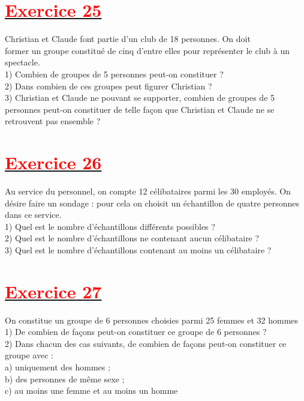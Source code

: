 \documentclass[12pt,a4paper]{article}
\begin{document}
\section*{\underline{\textbf{\textcolor{red}{Exercice 25}}}}
Christian et Claude font partie d’un club de 18 personnes. On doit\\ former un groupe constitué de cinq d’entre elles pour représenter le club à un spectacle.\\
1) Combien de groupes de 5 personnes peut-on constituer ?\\
2) Dans combien de ces groupes peut figurer Christian ?\\
3) Christian et Claude ne pouvant se supporter, combien de groupes de 5 personnes peut-on constituer de telle façon que Christian et Claude ne se retrouvent pas ensemble ?\\
\section*{\underline{\textbf{\textcolor{red}{Exercice 26}}}}
Au service du personnel, on compte 12 célibataires parmi les 30 employés. On désire faire un sondage : pour cela on choisit un échantillon de quatre personnes dans ce service.\\
1) Quel est le nombre d’échantillons différents possibles ?\\
2) Quel est le nombre d’échantillons ne contenant aucun célibataire ?\\
3) Quel est le nombre d’échantillons contenant au moins un célibataire ?\\
\section*{\underline{\textbf{\textcolor{red}{Exercice 27}}}}
On constitue un groupe de 6 personnes choisies parmi 25 femmes et 32 hommes\\
1) De combien de façons peut-on constituer ce groupe de 6 personnes ?\\
2) Dans chacun des cas suivants, de combien de façons peut-on constituer ce groupe avec :\\
a) uniquement des hommes ;\\
b) des personnes de même sexe ;\\
c) au moins une femme et au moins un homme\\
\end{document}
